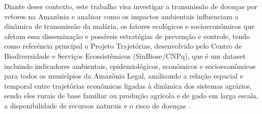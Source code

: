 Diante desse contexto, este trabalho visa investigar a transmissão de 
doenças por vetores na Amazônia e analisar como os impactos ambientais 
influenciam a dinâmica de transmissão da malária, os fatores ecológicos 
e socioeconômicos que afetam essa disseminação e possíveis estratégias 
de prevenção e controle, tendo como referência principal o Projeto 
Trajetórias, desenvolvido pelo Centro de Biodiversidade e Serviços Ecossistêmicos (SinBiose/CNPq), que é um dataset incluindo 
indicadores ambientais, epidemiológicos, econômicos e socioeconômicos 
para todos os municípios da Amazônia Legal, analisando a relação espacial 
e temporal entre trajetórias econômicas ligadas à dinâmica dos sistemas 
agrários, sendo eles rurais de base familiar ou produção agrícola e de 
gado em larga escala, a disponibilidade de recursos naturais e o risco 
de doenças \cite{Rorato2023}.